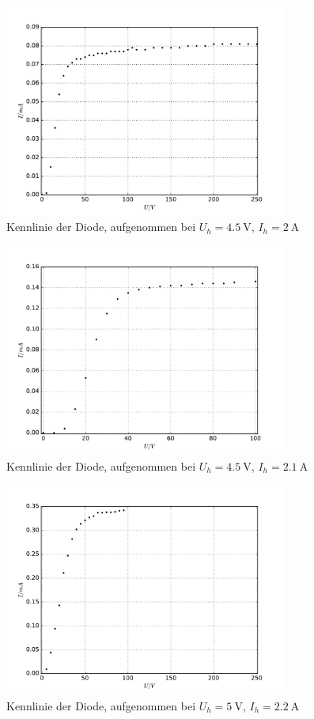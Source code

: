\begin{figure}
  \centering
  \includegraphics[height=7cm]{./plots/Plot3.pdf}
  \caption{Kennlinie der Diode, aufgenommen bei $U_h = \SI{4.5}{\volt}$, $I_h = \SI{2}{\ampere}$}
  \label{fig:Plot3}
\end{figure}

\begin{figure}
  \centering
  \includegraphics[height=7cm]{./plots/Plot4.pdf}
  \caption{Kennlinie der Diode, aufgenommen bei $U_h = \SI{4.5}{\volt}$, $I_h = \SI{2.1}{\ampere}$}
  \label{fig:Plot4}
\end{figure}

\begin{figure}
  \centering
  \includegraphics[height=7cm]{./plots/Plot5.pdf}
  \caption{Kennlinie der Diode, aufgenommen bei $U_h = \SI{5}{\volt}$, $I_h = \SI{2.2}{\ampere}$}
  \label{fig:Plot5}
\end{figure}

